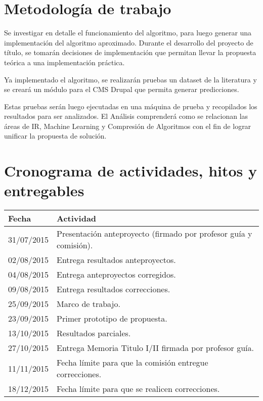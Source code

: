 \documentclass{udparticle}
\begin{document}
 
 
 

\section{Metodología de trabajo}


Se investigar en detalle el funcionamiento del algoritmo, para luego generar una implementación del algoritmo aproximado.
Durante el desarrollo del proyecto de título, se tomarán decisiones de implementación que permitan llevar la propuesta teórica a una implementación
práctica.

Ya implementado el algoritmo, se realizarán pruebas un dataset de la literatura y se creará un módulo para el CMS Drupal que permita generar predicciones.

Estas pruebas serán luego ejecutadas en una máquina de prueba y recopilados los resultados para ser analizados.
El Análisis comprenderá como se relacionan las áreas de IR, Machine Learning y Compresión de Algoritmos con el fin de lograr unificar la propuesta de solución. 


 



\section{Cronograma de actividades, hitos y entregables}
  \begin{tabular}{ll}
  \hline\noalign{\smallskip}
  Fecha & Actividad \\
  \hline\noalign{\smallskip}
  31/07/2015 & Presentación anteproyecto (firmado por profesor guía y comisión).\\
  02/08/2015 & Entrega resultados anteproyectos.\\
  04/08/2015 & Entrega anteproyectos corregidos.\\
  09/08/2015 & Entrega resultados correcciones.\\
  25/09/2015 & Marco de trabajo.\\
  23/09/2015 & Primer prototipo de propuesta.\\
  13/10/2015 & Resultados parciales.\\
  27/10/2015 & Entrega Memoria Titulo I/II firmada por profesor guía.\\
  11/11/2015 & Fecha límite para que la comisión entregue correcciones.\\
  18/12/2015 & Fecha límite para que se realicen correcciones.\\

  \hline

  \end{tabular}
\end{document}
